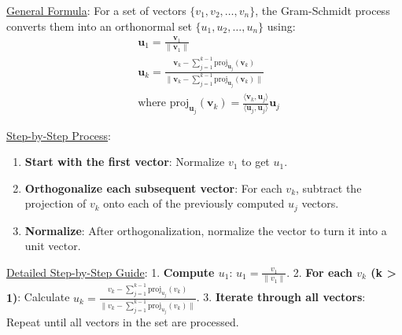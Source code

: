 \documentclass[8pt, a4paper, landscape]{extarticle} %
\begin{document}
\begin{multicols*}{4}
  \underline{General Formula}:
  For a set of vectors \( \{v_1, v_2, \ldots, v_n\} \), the Gram-Schmidt process converts them into an orthonormal set \( \{u_1, u_2, \ldots, u_n\} \) using:
  \[
    \begin{aligned}
       & \mathbf{u}_1 = \frac{\mathbf{v}_1}{\|\mathbf{v}_1\|}                                                                                                                         \\
       & \mathbf{u}_k = \frac{\mathbf{v}_k - \sum_{j=1}^{k-1} \text{proj}_{\mathbf{u}_j}(\mathbf{v}_k)}{\|\mathbf{v}_k - \sum_{j=1}^{k-1} \text{proj}_{\mathbf{u}_j}(\mathbf{v}_k)\|} \\
       & \text{where proj}_{\mathbf{u}_j}(\mathbf{v}_k) = \frac{\langle \mathbf{v}_k, \mathbf{u}_j \rangle}{\langle \mathbf{u}_j, \mathbf{u}_j \rangle} \mathbf{u}_j
    \end{aligned}
  \]

  \underline{Step-by-Step Process}:
  \begin{enumerate}
    \item \textbf{Start with the first vector}: Normalize \( v_1 \) to get \( u_1 \).
    \item \textbf{Orthogonalize each subsequent vector}: For each \( v_k \), subtract the projection of \( v_k \) onto each of the previously computed \( u_j \) vectors.
    \item \textbf{Normalize}: After orthogonalization, normalize the vector to turn it into a unit vector.
  \end{enumerate}

  \underline{Detailed Step-by-Step Guide}:
  1. \textbf{Compute \( u_1 \)}: \( u_1 = \frac{v_1}{\|v_1\|} \).
  2. \textbf{For each \( v_k \) (k > 1)}: Calculate \( u_k = \frac{v_k - \sum_{j=1}^{k-1} \text{proj}_{u_j}(v_k)}{\|v_k - \sum_{j=1}^{k-1} \text{proj}_{u_j}(v_k)\|} \).
  3. \textbf{Iterate through all vectors}: Repeat until all vectors in the set are processed.


\end{multicols*}
\end{document}
